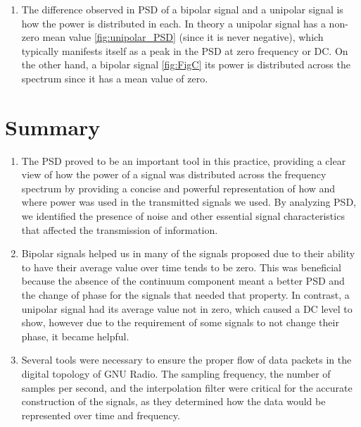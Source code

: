 \documentclass{journal}[IEEEtran, twocolumn]             %
\begin{document}
\begin{multicols}{2}
\begin{enumerate}
    \item The difference observed in PSD of a bipolar signal and a unipolar signal is how the power is distributed in each. In theory a unipolar signal has a non-zero mean value \ref{fig:unipolar_PSD} (since it is never negative), which typically manifests itself as a peak in the PSD at zero frequency or DC. On the other hand, a bipolar signal \ref{fig:FigC} its power is distributed across the spectrum since it has a mean value of zero.
    
\end{enumerate}

\section{Summary}

\begin{enumerate}
 \item The PSD proved to be an important tool in this practice, providing a clear view of how the power of a signal was distributed across the frequency spectrum by providing a concise and powerful representation of how and where power was used in the transmitted signals we used. By analyzing PSD, we identified the presence of noise and other essential signal characteristics that affected the transmission of information. 

 \item Bipolar signals helped us in many of the signals proposed due to their ability to have their average value over time tends to be zero.
 This was beneficial because the absence of the continuum component meant a better PSD and the change of phase for the signals that needed that property.
 In contrast, a unipolar signal had its average value not in zero, which caused a DC level to show, however due to the requirement of some signals to not change their phase, it became helpful.

 \item Several tools were necessary to ensure the proper flow of data packets in the digital topology of GNU Radio. The sampling frequency, the number of samples per second, and the interpolation filter were critical for the accurate construction of the signals, as they determined how the data would be represented over time and frequency.

\end{enumerate}


\nocite{*}

\end{multicols}
\end{document}

